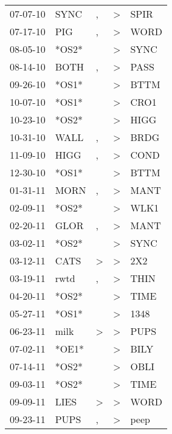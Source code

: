 \begin{supertabular}{lllll}
 07-07-10 &   SYNC &                , &     \textgreater &   SPIR \\
 07-17-10 &    PIG &                , &     \textgreater &   WORD \\
 08-05-10 &  *OS2* &                  &     \textgreater &   SYNC \\
 08-14-10 &   BOTH &                , &     \textgreater &   PASS \\
 09-26-10 &  *OS1* &                  &     \textgreater &   BTTM \\
 10-07-10 &  *OS1* &                  &     \textgreater &   CRO1 \\
 10-23-10 &  *OS2* &                  &     \textgreater &   HIGG \\
 10-31-10 &   WALL &                , &     \textgreater &   BRDG \\
 11-09-10 &   HIGG &                , &     \textgreater &   COND \\
 12-30-10 &  *OS1* &                  &     \textgreater &   BTTM \\
 01-31-11 &   MORN &                , &     \textgreater &   MANT \\
 02-09-11 &  *OS2* &                  &     \textgreater &   WLK1 \\
 02-20-11 &   GLOR &                , &     \textgreater &   MANT \\
 03-02-11 &  *OS2* &                  &     \textgreater &   SYNC \\
 03-12-11 &   CATS &     \textgreater &     \textgreater &    2X2 \\
 03-19-11 &   rwtd &                , &     \textgreater &   THIN \\
 04-20-11 &  *OS2* &                  &     \textgreater &   TIME \\
 05-27-11 &  *OS1* &                  &     \textgreater &   1348 \\
 06-23-11 &   milk &     \textgreater &     \textgreater &   PUPS \\
 07-02-11 &  *OE1* &                  &     \textgreater &   BILY \\
 07-14-11 &  *OS2* &                  &     \textgreater &   OBLI \\
 09-03-11 &  *OS2* &                  &     \textgreater &   TIME \\
 09-09-11 &   LIES &     \textgreater &     \textgreater &   WORD \\
 09-23-11 &   PUPS &                , &     \textgreater &   peep \\

\end{supertabular}
